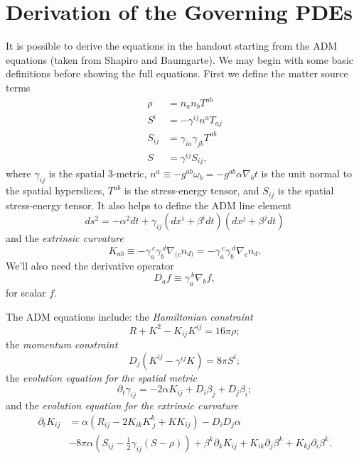 \documentclass[12pt]{article}
\numberwithin{equation}{section}
\begin{document}
\section{Derivation of the Governing PDEs}
It is possible to derive the equations in the handout starting from the ADM equations (taken from Shapiro and Baumgarte).  We may begin with some basic definitions before showing the full equations.  First we define the matter source terms
\begin{align}
\rho &= n_a n_b T^{ab} \\
S^i &= -\gamma^{ij} n^a T_{aj} \\
S_{ij} &= \gamma_{ia} \gamma_{jb} T^{ab} \\
S &= \gamma^{ij} S_{ij},
\end{align}
where $\gamma_{ij}$ is the spatial 3-metric, $n^a \equiv - g^{ab} \omega_b = -g^{ab} \alpha \nabla_b t$ is the unit normal to the spatial hyperslices, $T^{ab}$ is the stress-energy tensor, and $S_{ij}$ is the spatial stress-energy tensor.  It also helps to define the ADM line element
\begin{equation} \label{eq:ADM_line_element}
ds^2 = -\alpha^2 dt + \gamma_{ij} (dx^i + \beta^i dt) (dx^j + \beta^j dt)
\end{equation}
and the \textit{extrinsic curvature}
\begin{equation}
K_{ab} \equiv - \gamma_a^{~c} \gamma_b^{~d} \nabla_{(c} n_{d)} = - \gamma_a^{~c} \gamma_b^{~d} \nabla_c n_d.
\end{equation}
We'll also need the derivative operator
\begin{equation}
D_a f \equiv \gamma_{a}^{~b} \nabla_b f,
\end{equation}
for scalar $f$.

The ADM equations include: the \textit{Hamiltonian constraint}
\begin{equation}
R + K^2 - K_{ij} K^{ij} = 16 \pi \rho;
\end{equation}
the \textit{momentum constraint}
\begin{equation}
D_j (K^{ij} - \gamma^{ij} K) = 8 \pi S^{i};
\end{equation}
the \textit{evolution equation for the spatial metric}
\begin{equation} \label{eq:spatial_metric_evol}
\partial_t \gamma_{ij} = -2 \alpha K_{ij} + D_i \beta_j + D_j \beta_i;
\end{equation}
and the \textit{evolution equation for the extrinsic curvature}
\begin{equation}
\begin{aligned}
\partial_t K_{ij} &= \alpha (R_{ij} - 2 K_{ik} K^{k}_{~j} + K K_{ij}) - D_i D_j \alpha \\
&- 8 \pi \alpha (S_{ij} - \frac{1}{2} \gamma_{ij} (S - \rho)) + \beta^k \partial_k K_{ij} + K_{ik} \partial_j \beta^k + K_{kj} \partial_i \beta^k.
\end{aligned}
\end{equation}
\end{document}
